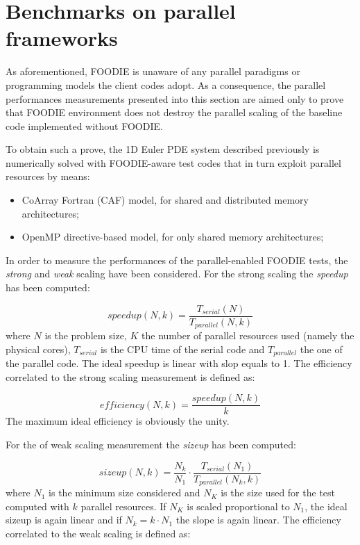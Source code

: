 \section{Benchmarks on parallel frameworks}\label{sec:parallel}

As aforementioned, FOODIE is unaware of any parallel paradigms or programming models the client codes adopt. As a consequence, the parallel performances measurements presented into this section are aimed only to prove that FOODIE environment does not destroy the parallel scaling of the baseline code implemented without FOODIE.

To obtain such a prove, the 1D Euler PDE system described previously is numerically solved with FOODIE-aware test codes that in turn exploit parallel resources by means:

\begin{itemize}
  \item CoArray Fortran (CAF) model, for shared and distributed memory architectures;
  \item OpenMP directive-based model, for only shared memory architectures;
  \end{itemize}

In order to measure the performances of the parallel-enabled FOODIE tests, the \emph{strong} and \emph{weak} scaling have been considered. For the strong scaling the \emph{speedup} has been computed:

\begin{equation}
  speedup(N, k) = \frac{T_{serial}(N)}{T_{parallel}(N, k)}
  \label{eq:strong-scaling-speedup}
\end{equation}
where $N$ is the problem size, $K$ the number of parallel resources used (namely the physical cores), $T_{serial}$ is the CPU time of the serial code and $T_{parallel}$ the one of the parallel code. The ideal speedup is linear with slop equals to 1. The efficiency correlated to the strong scaling measurement is defined as:

\begin{equation}
  efficiency(N, k) = \frac{speedup(N, k)}{k}
  \label{eq:strong-scaling-efficiency}
\end{equation}
The maximum ideal efficiency is obviously the unity.

For the of weak scaling measurement the \emph{sizeup} has been computed:

\begin{equation}
  sizeup(N, k) = \frac{N_k}{N_1} \cdot \frac{T_{serial}(N_1)}{T_{parallel}(N_k, k)}
  \label{eq:weak-scaling-sizeup}
\end{equation}
where $N_1$ is the minimum size considered and $N_K$ is the size used for the test computed with $k$ parallel resources. If $N_K$ is scaled proportional to $N_1$, the ideal sizeup is again linear and if $N_k = k \cdot N_1$ the slope is again linear. The efficiency correlated to the weak scaling is defined as:

